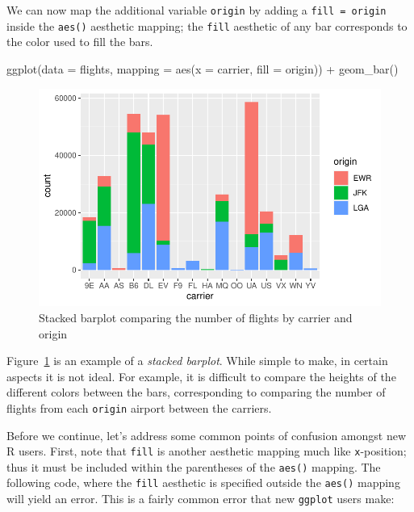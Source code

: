 \documentclass[
  letterpaper,
  DIV=11,
  numbers=noendperiod]{scrreprt}
\newenvironment{Shaded}{\begin{snugshade}}{\end{snugshade}}
\newcommand{\AttributeTok}[1]{\textcolor[rgb]{0.40,0.45,0.13}{#1}}
\newcommand{\FunctionTok}[1]{\textcolor[rgb]{0.28,0.35,0.67}{#1}}
\newcommand{\NormalTok}[1]{\textcolor[rgb]{0.00,0.23,0.31}{#1}}
\newcommand{\SpecialCharTok}[1]{\textcolor[rgb]{0.37,0.37,0.37}{#1}}
\theoremstyle{definition}
\theoremstyle{remark}
\begin{document}
We can now map the additional variable \texttt{origin} by adding a
\texttt{fill\ =\ origin} inside the \texttt{aes()} aesthetic mapping;
the \texttt{fill} aesthetic of any bar corresponds to the color used to
fill the bars.

\begin{Shaded}
\begin{Highlighting}[]
\FunctionTok{ggplot}\NormalTok{(}\AttributeTok{data =}\NormalTok{ flights, }\AttributeTok{mapping =} \FunctionTok{aes}\NormalTok{(}\AttributeTok{x =}\NormalTok{ carrier, }\AttributeTok{fill =}\NormalTok{ origin)) }\SpecialCharTok{+}
  \FunctionTok{geom\_bar}\NormalTok{()}
\end{Highlighting}
\end{Shaded}

\begin{figure}[H]

{\centering \includegraphics{02-visualization_files/figure-pdf/fig-flights-stacked-bar-1.pdf}

}

\caption{\label{fig-flights-stacked-bar}Stacked barplot comparing the
number of flights by carrier and origin}

\end{figure}

Figure~\ref{fig-flights-stacked-bar} is an example of a \emph{stacked
barplot}. While simple to make, in certain aspects it is not ideal. For
example, it is difficult to compare the heights of the different colors
between the bars, corresponding to comparing the number of flights from
each \texttt{origin} airport between the carriers.

Before we continue, let's address some common points of confusion
amongst new R users. First, note that \texttt{fill} is another aesthetic
mapping much like \texttt{x}-position; thus it must be included within
the parentheses of the \texttt{aes()} mapping. The following code, where
the \texttt{fill} aesthetic is specified outside the \texttt{aes()}
mapping will yield an error. This is a fairly common error that new
\texttt{ggplot} users make:
\end{document}
